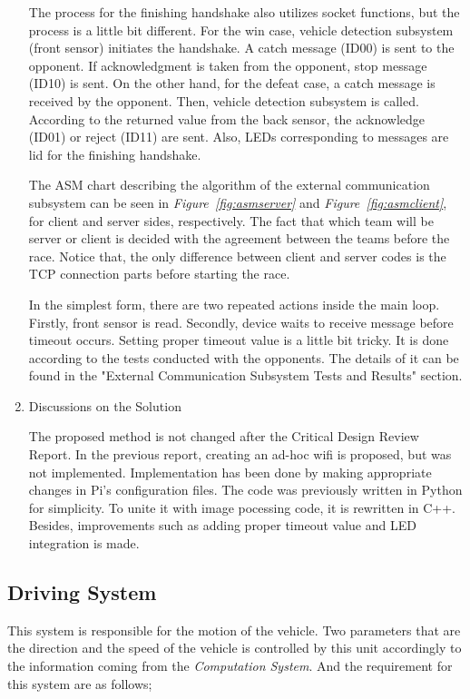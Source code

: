 \documentclass[a4paper,12pt]{article}
\begin{document}
\begin{enumerate}
	The process for the finishing handshake also utilizes socket functions, but the process is a little bit different. For the win case, vehicle detection subsystem (front sensor) initiates the handshake. A catch message (ID00) is sent to the opponent. If acknowledgment is taken from the opponent, stop message (ID10) is sent. On the other hand, for the defeat case, a catch message is received by the opponent. Then, vehicle detection subsystem is called. According to the returned value from the back sensor, the acknowledge (ID01) or reject (ID11) are sent. Also, LEDs corresponding to messages are lid for the finishing handshake.
	
	
	
	The ASM chart describing the algorithm of the external communication subsystem can be seen in \textit{Figure~\ref{fig:asmserver}} and \textit{Figure~\ref{fig:asmclient}}, for client and server sides, respectively. The fact that which team will be server or client is decided with the agreement between the teams before the race. Notice that, the only difference between client and server codes is the TCP connection parts before starting the race. 
	
	In the simplest form, there are two repeated actions inside the main loop. Firstly, front sensor is read. Secondly, device waits to receive message before timeout occurs. Setting proper timeout value is a little bit tricky. It is done according to the tests conducted with the opponents. The details of it can be found in the "External Communication Subsystem Tests and Results" section.
	
	
	\item {Discussions on the Solution}
	
	The proposed method is not changed after the Critical Design Review Report. In the previous report, creating an ad-hoc wifi is proposed, but was not implemented. Implementation has been done by making appropriate changes in Pi's configuration files. The code was previously written in Python for simplicity. To unite it with image pocessing code, it is rewritten in C++. Besides, improvements such as adding proper timeout value and LED integration is made.
\end{enumerate}




\subsection{Driving System}

	This system is responsible for the motion of the vehicle. Two parameters that are the direction and the speed of the vehicle is controlled by this unit accordingly to the information coming from the \textit{Computation System}. And the requirement for this system are as follows;
\end{document}
